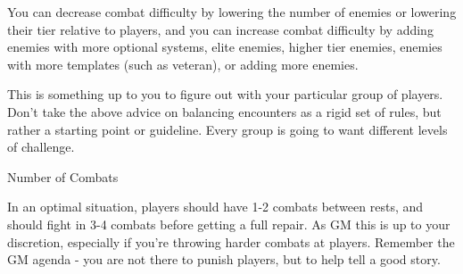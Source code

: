 You can decrease combat difficulty by lowering the number of enemies or lowering their tier  
relative to players, and you can increase combat difficulty by adding enemies with more optional  
systems, elite enemies, higher tier enemies, enemies with more templates (such as veteran), or  
adding more enemies.
 

                                                                                                          


This is something up to you to figure out with your particular group of players. Don’t take the  
above advice on balancing encounters as a rigid set of rules, but rather a starting point or  
guideline. Every group is going to want different levels of challenge.
 

                                          Number of Combats  

In an optimal situation, players should have 1-2 combats between rests, and should fight in 3-4  
combats before getting a full repair. As GM this is up to your discretion, especially if you’re  
throwing harder combats at players. Remember the GM agenda - you are not there to punish  
players, but to help tell a good story.
 

                                                                                                          
